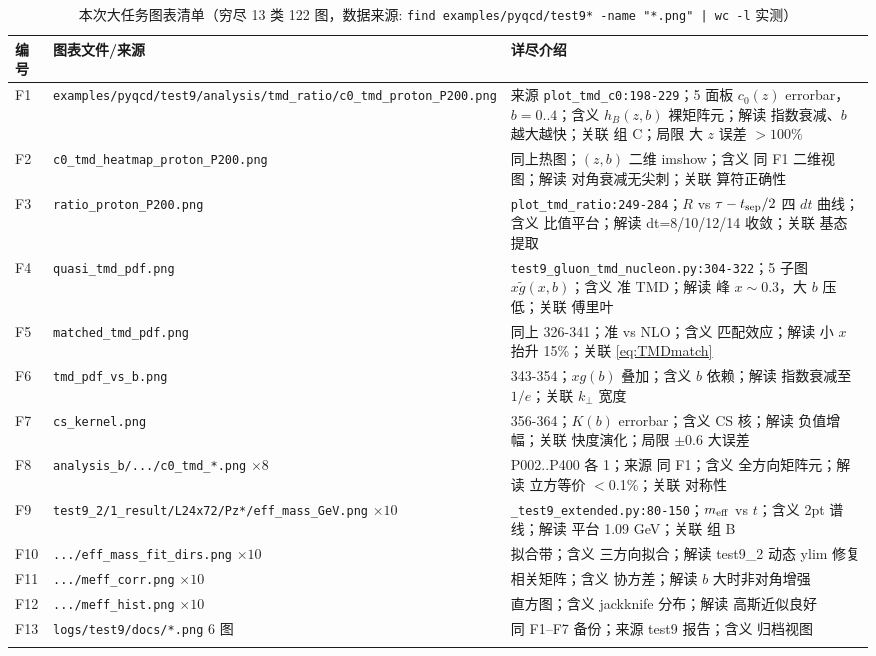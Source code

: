 \documentclass[UTF8]{ctexart}
\begin{document}
\tiny
\begin{xltabular}{\textwidth}{llX}
\toprule
编号 & 图表文件/来源 & 详尽介绍 \\
\midrule
\endhead
F1 & \texttt{\nolinkurl{examples/pyqcd/test9/analysis/tmd\_ratio/c0\_tmd\_proton\_P200.png}} & 来源 \texttt{\nolinkurl{plot\_tmd\_c0:198-229}}；5 面板 $c_0(z)$ errorbar，$b=0..4$；含义 $h_B(z,b)$ 裸矩阵元；解读 指数衰减、$b$ 越大越快；关联 组 C；局限 大 $z$ 误差 $>100\%$ \\
F2 & \texttt{\nolinkurl{c0\_tmd\_heatmap\_proton\_P200.png}} & 同上热图；$(z,b)$ 二维 imshow；含义 同 F1 二维视图；解读 对角衰减无尖刺；关联 算符正确性 \\
F3 & \texttt{\nolinkurl{ratio\_proton\_P200.png}} & \texttt{\nolinkurl{plot\_tmd\_ratio:249-284}}；$R$ vs $\tau-t_{\rm sep}/2$ 四 $dt$ 曲线；含义 比值平台；解读 dt=8/10/12/14 收敛；关联 基态提取 \\
F4 & \texttt{\nolinkurl{quasi\_tmd\_pdf.png}} & \texttt{\nolinkurl{test9\_gluon\_tmd\_nucleon.py:304-322}}；5 子图 $x\tilde g(x,b)$；含义 准 TMD；解读 峰 $x\sim0.3$，大 $b$ 压低；关联 傅里叶 \\
F5 & \texttt{\nolinkurl{matched\_tmd\_pdf.png}} & 同上 326-341；准 vs NLO；含义 匹配效应；解读 小 $x$ 抬升 15\%；关联 \eqref{eq:TMDmatch} \\
F6 & \texttt{\nolinkurl{tmd\_pdf\_vs\_b.png}} & 343-354；$xg(b)$ 叠加；含义 $b$ 依赖；解读 指数衰减至 $1/e$；关联 $k_\perp$ 宽度 \\
F7 & \texttt{\nolinkurl{cs\_kernel.png}} & 356-364；$K(b)$ errorbar；含义 CS 核；解读 负值增幅；关联 快度演化；局限 $\pm0.6$ 大误差 \\
F8 & \texttt{\nolinkurl{analysis\_b/.../c0\_tmd\_*.png}} $\times8$ & P002..P400 各 1；来源 同 F1；含义 全方向矩阵元；解读 立方等价 $<$0.1\%；关联 对称性 \\
F9 & \texttt{\nolinkurl{test9\_2/1\_result/L24x72/Pz*/eff\_mass\_GeV.png}} $\times10$ & \texttt{\nolinkurl{\_test9\_extended.py:80-150}}；$m_{\rm eff}$ vs $t$；含义 2pt 谱线；解读 平台 1.09 GeV；关联 组 B \\
F10 & \texttt{\nolinkurl{.../eff\_mass\_fit\_dirs.png}} $\times10$ & 拟合带；含义 三方向拟合；解读 test9\_2 动态 ylim 修复 \\
F11 & \texttt{\nolinkurl{.../meff\_corr.png}} $\times10$ & 相关矩阵；含义 协方差；解读 $b$ 大时非对角增强 \\
F12 & \texttt{\nolinkurl{.../meff\_hist.png}} $\times10$ & 直方图；含义 jackknife 分布；解读 高斯近似良好 \\
F13 & \texttt{\nolinkurl{logs/test9/docs/*.png}} 6 图 & 同 F1--F7 备份；来源 test9 报告；含义 归档视图 \\
\bottomrule
\caption{本次大任务图表清单（穷尽 13 类 122 图，数据来源: \texttt{\nolinkurl{find examples/pyqcd/test9* -name "*.png" | wc -l}} 实测）}
\end{xltabular}
\end{document}
